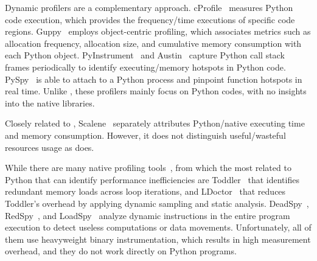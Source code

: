 
Dynamic profilers are a complementary approach. cProfile~\cite{cProfile} measures Python code execution, which provides the frequency/time executions of specific code regions. Guppy~\cite{guppy3} employs object-centric profiling, which associates metrics such as allocation frequency, allocation size, and cumulative memory consumption with each Python object. PyInstrument~\cite{pyinstrument} and Austin~\cite{austin} capture Python call stack frames periodically to identify executing/memory hotspots in Python code. PySpy~\cite{py-spy} is able to attach to a Python process and pinpoint function hotspots in real time. Unlike \tool, these profilers mainly focus on Python codes, with no insights into the native libraries.

Closely related to \tool{}, Scalene~\cite{berger2020scalene} separately attributes Python/native executing time and memory consumption. However, it does not distinguish useful/wasteful resources usage as \tool does. %







While there are many native profiling tools~\cite{reinders2005vtune, de2010new, adhianto2010hpctoolkit}, from which the most related to Python that can identify performance inefficiencies are Toddler~\cite{nistor2013toddler} that identifies redundant memory loads across loop iterations, and LDoctor~\cite{song2017performance} that reduces Toddler's overhead by applying dynamic sampling and static analysis. DeadSpy~\cite{chabbi2012deadspy}, RedSpy~\cite{wen2017redspy}, and LoadSpy~\cite{loadspy} analyze dynamic instructions in the entire program execution to detect useless computations or data movements. Unfortunately, all of them use heavyweight binary instrumentation, which results in high measurement overhead, and they do not work directly on Python programs.

